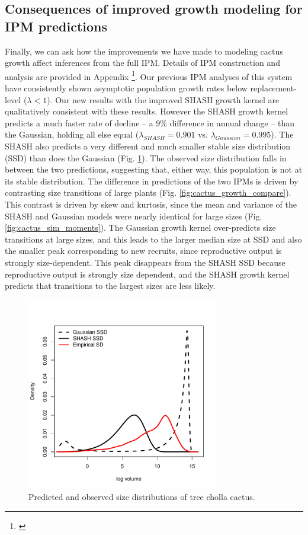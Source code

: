 \documentclass[11pt]{article}
\newcommand{\tom}[2]{{\color{red}{#1}}\footnote{\textit{\color{red}{#2}}}}
\begin{document}
{\subsection{Consequences of improved growth modeling for IPM predictions}
Finally, we can ask how the improvements we have made to modeling cactus growth affect inferences from the full IPM.
Details of IPM construction and analysis are provided in Appendix \tom{\#}{Need to do. Maybe we can have one appendix for all the IPMs.}.
Our previous IPM analyses of this system have consistently shown asymptotic population growth rates below replacement-level ($\lambda < 1$).
Our new results with the improved SHASH growth kernel are qualitatively consistent with these results.
However the SHASH growth kernel predicts a much faster rate of decline -- a $9\%$ difference in annual change -- than the Gaussian, holding all else equal ($\lambda_{SHASH} = 0.901$ vs. $\lambda_{Gaussian} = 0.995$).
The SHASH also predicts a very different and much smaller stable size distribution (SSD) than does the Gaussian (Fig. \ref{fig:cactus_ssd}). 
The observed size distribution falls in between the two predictions, suggesting that, either way, this population is not at its stable distribution. 
The difference in predictions of the two IPMs is driven by contrasting size transitions of large plants (Fig. \ref{fig:cactus_growth_compare}).
This contrast is driven by skew and kurtosis, since the mean and variance of the SHASH and Gaussian models were nearly identical for large sizes (Fig. \ref{fig:cactus_sim_moments}). 
The Gaussian growth kernel over-predicts size transitions at large sizes, and this leads to the larger median size at SSD and also the smaller peak corresponding to new recruits, since reproductive output is strongly size-dependent. 
This peak disappears from the SHASH SSD because reproductive output is strongly size dependent, and the SHASH growth kernel predicts that transitions to the largest sizes are less likely. 
\begin{figure}
\centering
\includegraphics[width=0.75\textwidth]{figures/cactus_ssd}
\caption{Predicted and observed size distributions of tree cholla cactus.}
\label{fig:cactus_ssd}
\end{figure} 
 
}
\end{document}
